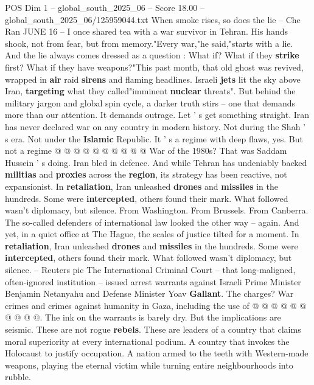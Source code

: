 \begin{textsample}{POS Dim 1 – global\_south\_2025\_06 – Score 18.00 – global\_south\_2025\_06/125959044.txt}  \label{ex:f1_pos_220}
When smoke rises, so does the lie -- Che Ran JUNE 16 -- I once shared tea with a war survivor in Tehran.
His hands shook, not from fear, but from memory."Every war,"he said,"starts with a lie.
And the lie always comes dressed as a question : What if?
What if they \textbf{strike} first?
What if they have weapons?"This past month, that old ghost was revived, wrapped in \textbf{air} raid \textbf{sirens} and flaming headlines.
Israeli \textbf{jets} lit the sky above Iran, \textbf{targeting} what they called"imminent \textbf{nuclear} threats".
But behind the military jargon and global spin cycle, a darker truth stirs -- one that demands more than our attention.
It demands outrage.
Let ' s get something straight.
Iran has never declared war on any country in modern history.
Not during the Shah ' s era.
Not under the \textbf{Islamic} Republic.
It ' s a regime with deep flaws, yes.
But not a regime @ @ @ @ @ @ @ @ @ @ War of the 1980s?
That was Saddam Hussein ' s doing.
Iran bled in defence.
And while Tehran has undeniably backed \textbf{militias} and \textbf{proxies} across the \textbf{region}, its strategy has been reactive, not expansionist.
In \textbf{retaliation}, Iran unleashed \textbf{drones} and \textbf{missiles} in the hundreds.
Some were \textbf{intercepted}, others found their mark.
What followed wasn't diplomacy, but silence.
From Washington.
From Brussels.
From Canberra.
The so-called defenders of international law looked the other way -- again.
And yet, in a quiet office at The Hague, the scales of justice tilted for a moment.
In \textbf{retaliation}, Iran unleashed \textbf{drones} and \textbf{missiles} in the hundreds.
Some were \textbf{intercepted}, others found their mark.
What followed wasn't diplomacy, but silence. -- Reuters pic The International Criminal Court -- that long-maligned, often-ignored institution -- issued arrest warrants against Israeli Prime Minister Benjamin Netanyahu and Defense Minister Yoav \textbf{Gallant}.
The charges?
War crimes and crimes against humanity in Gaza, including the use of @ @ @ @ @ @ @ @ @ @.
The ink on the warrants is barely dry.
But the implications are seismic.
These are not rogue \textbf{rebels}.
These are leaders of a country that claims moral superiority at every international podium.
A country that invokes the Holocaust to justify occupation.
A nation armed to the teeth with Western-made weapons, playing the eternal victim while turning entire neighbourhoods into rubble.

\end{textsample}
